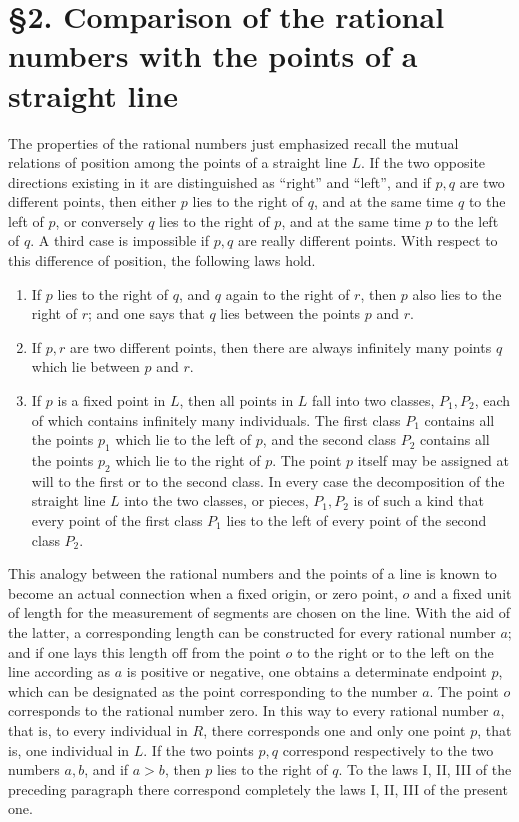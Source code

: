\documentclass[11pt]{article}
\begin{document}
\section*{\S 2. Comparison of the rational numbers with the points of a straight line}

The properties of the rational numbers just emphasized recall the mutual relations of position among the points of a straight line $L$. If the two opposite directions existing in it are distinguished as ``right'' and ``left'', and if $p,q$ are two different points, then either $p$ lies to the right of $q$, and at the same time $q$ to the left of $p$, or conversely $q$ lies to the right of $p$, and at the same time $p$ to the left of $q$. A third case is impossible if $p,q$ are really different points. With respect to this difference of position, the following laws hold.

\begin{enumerate}[label=\Roman*.]
\item If $p$ lies to the right of $q$, and $q$ again to the right of $r$, then $p$ also lies to the right of $r$; and one says that $q$ lies between the points $p$ and $r$.
\item If $p,r$ are two different points, then there are always infinitely many points $q$ which lie between $p$ and $r$.
\item If $p$ is a fixed point in $L$, then all points in $L$ fall into two classes, $P_1,P_2$, each of which contains infinitely many individuals. The first class $P_1$ contains all the points $p_1$ which lie to the left of $p$, and the second class $P_2$ contains all the points $p_2$ which lie to the right of $p$. The point $p$ itself may be assigned at will to the first or to the second class. In every case the decomposition of the straight line $L$ into the two classes, or pieces, $P_1,P_2$ is of such a kind that every point of the first class $P_1$ lies to the left of every point of the second class $P_2$.
\end{enumerate}

This analogy between the rational numbers and the points of a line is known to become an actual connection when a fixed origin, or zero point, $o$ and a fixed unit of length for the measurement of segments are chosen on the line. With the aid of the latter, a corresponding length can be constructed for every rational number $a$; and if one lays this length off from the point $o$ to the right or to the left on the line according as $a$ is positive or negative, one obtains a determinate endpoint $p$, which can be designated as the point corresponding to the number $a$. The point $o$ corresponds to the rational number zero. In this way to every rational number $a$, that is, to every individual in $R$, there corresponds one and only one point $p$, that is, one individual in $L$. If the two points $p,q$ correspond respectively to the two numbers $a,b$, and if $a>b$, then $p$ lies to the right of $q$. To the laws I, II, III of the preceding paragraph there correspond completely the laws I, II, III of the present one.
\end{document}
